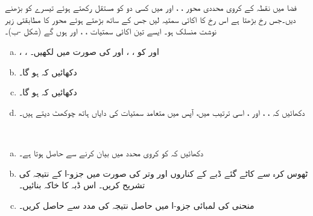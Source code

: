 \\
\\
فضا میں نقطہ  کے کروی محددی  محور    ،  ، اور  میں کسی دو کو مستقل رکھتے ہوئے  تیسرے کو بڑھنے دیں۔جس رخ  بڑھتا ہے اس رخ    کا  اکائی سمتیہ  لیں  جس  کے ساتھ  بڑھتے ہوئے محور   کا مطابقتی زیر نوشت   منسلک ہو۔ ایسے تین اکائی سمتیات ، ،  اور  ہوں گے (شکل -ب)۔
\begin{enumerate}[a.]
\item
{}، ،  اور  کو ، ،  اور  کی صورت میں لکھیں۔
\item
دکھائیں کہ  ہو گا۔
\item
دکھائیں کہ  ہو گا۔
\item
دکھائیں کہ ، ،  اور ، اسی ترتیب میں، آپس میں متعامد سمتیات کی  دایاں ہاتھ   چوکھٹ دیتے ہیں۔
\end{enumerate}
\\
\begin{enumerate}[a.]
\item
دکھائیں کہ   کو  کروی  محدد میں بیان کرنے 
سے  حاصل ہوتا ہے۔
\item
ٹھوس کرہ سے کاٹے گئے ڈبے کے کناروں اور وتر  کی صورت میں جزو-ا کے نتیجہ کی تشریح کریں۔ اس ڈبہ کا خاکہ بنائیں۔
\item
منحنی  کی لمبائی جزو-ا میں حاصل نتیجہ کی مدد سے حاصل کریں۔
\end{enumerate}


